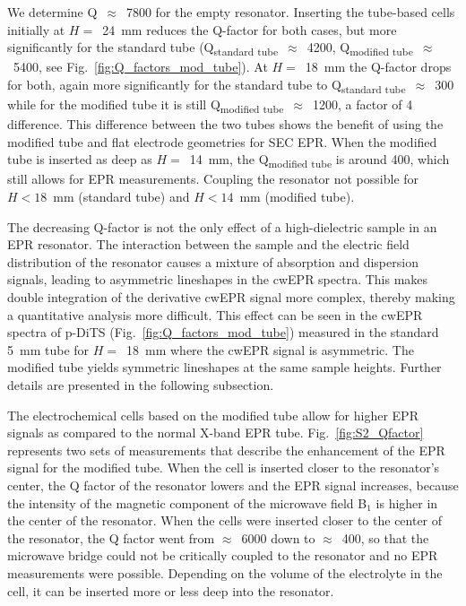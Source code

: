 We determine Q~$\approx$~7800 for the empty resonator. Inserting the tube-based cells initially at $H=$~24~mm reduces the Q-factor for both cases, but more significantly for the standard tube (Q\textsubscript{standard tube}~$\approx$~4200, Q\textsubscript{modified tube}~$\approx$~5400, see Fig.~\ref{fig:Q_factors_mod_tube}). At $H=$~18~mm the Q-factor drops for both, again more significantly for the standard tube to Q\textsubscript{standard tube}~$\approx$~300 while for the modified tube it is still Q\textsubscript{modified tube}~$\approx$~1200, a factor of 4 difference. This difference between the two tubes shows the benefit of using the modified tube and flat electrode geometries for SEC EPR. When the modified tube is inserted as deep as $H=$~14~mm, the Q\textsubscript{modified tube} is around 400, which still allows for EPR measurements. Coupling the resonator not possible for $H<18$~mm (standard tube) and $H<14$~mm (modified tube).

\par
The decreasing Q-factor is not the only effect of a high-dielectric sample in an EPR resonator. The interaction between the sample and the electric field distribution of the resonator causes a mixture of absorption and dispersion signals, leading to asymmetric lineshapes in the cwEPR spectra. This makes double integration of the derivative cwEPR signal more complex, thereby making a quantitative analysis more difficult. This effect can be seen in the cwEPR spectra of p-DiTS (Fig.~\ref{fig:Q_factors_mod_tube}) measured in the standard 5~mm tube for $H=$~18~mm where the cwEPR signal is asymmetric. The modified tube yields symmetric lineshapes at the same sample heights. Further details are presented in the following subsection.

\par

The electrochemical cells based on the modified tube allow for higher EPR signals as compared to the normal X-band EPR tube. Fig.~\ref{fig:S2_Qfactor} represents two sets of measurements that describe the enhancement of the EPR signal for the modified tube. When the cell is inserted closer to the resonator's center, the Q factor of the resonator lowers and the EPR signal increases, because the intensity of the magnetic component of the microwave field B$_1$ is higher in the center of the resonator. When the cells were inserted closer to the center of the resonator, the Q factor went from $\approx$~6000 down to $\approx$~400, so that the microwave bridge could not be critically coupled to the resonator and no EPR measurements were possible. Depending on the volume of the electrolyte in the cell, it can be inserted more or less deep into the resonator.

